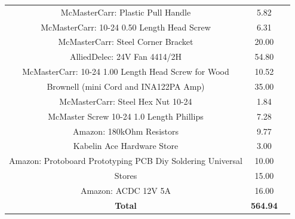 \documentclass[12pt]{article}
\begin{document}
\begin{table}[B]
\begin{tabular}{ccc}
McMasterCarr: Plastic Pull Handle                                   & 5.82        \\
McMasterCarr: 10-24 0.50 Length Head Screw                          & 6.31        \\
McMasterCarr: Steel Corner Bracket                                  & 20.00       \\
AlliedDelec: 24V Fan 4414/2H                                        & 54.80       \\
McMasterCarr: 10-24 1.00 Length Head Screw for Wood                 & 10.52       \\
Brownell (mini Cord and INA122PA Amp)                               & 35.00       \\
McMasterCarr: Steel Hex Nut 10-24                                   & 1.84        \\
McMaster Screw 10-24 1.0 Length Phillips                            & 7.28        \\
Amazon: 180kOhm Resistors                                           & 9.77        \\
Kabelin Ace Hardware Store                                          & 3.00        \\
Amazon: Protoboard Prototyping PCB Diy Soldering Universal          & 10.00       \\
Stores                                                              & 15.00       \\
Amazon: ACDC 12V 5A                                                 & 16.00      \\
\textbf{Total} 														&
\textbf{564.94}
\end{tabular}
\end{table}
\end{document}
